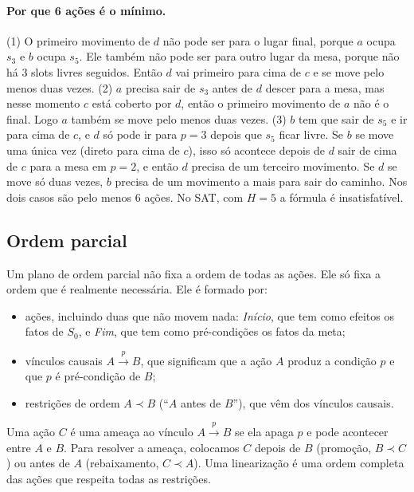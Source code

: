 \documentclass[11pt,a4paper]{article}
\begin{document}
\paragraph{Por que 6 ações é o mínimo.} (1) O primeiro movimento de $d$ não pode
ser para o lugar final, porque $a$ ocupa $s_3$ e $b$ ocupa $s_5$. Ele também não pode
ser para outro lugar da mesa, porque não há 3 slots livres seguidos. Então $d$ vai
primeiro para cima de $c$ e se move pelo menos duas vezes. (2) $a$ precisa sair de
$s_3$ antes de $d$ descer para a mesa, mas nesse momento $c$ está coberto por $d$,
então o primeiro movimento de $a$ não é o final. Logo $a$ também se move pelo menos
duas vezes. (3) $b$ tem que sair de $s_5$ e ir para cima de $c$, e $d$ só pode ir
para $p=3$ depois que $s_5$ ficar livre. Se $b$ se move uma única vez (direto para
cima de $c$), isso só acontece depois de $d$ sair de cima de $c$ para a mesa em
$p=2$, e então $d$ precisa de um terceiro movimento. Se $d$ se move só duas vezes,
$b$ precisa de um movimento a mais para sair do caminho. Nos dois casos são pelo
menos 6 ações. No SAT, com $H=5$ a fórmula é insatisfatível.

\subsection{Ordem parcial}
\label{sec:pop}
Um plano de ordem parcial não fixa a ordem de todas as ações. Ele só fixa a ordem
que é realmente necessária. Ele é formado por:
\begin{itemize}
  \item ações, incluindo duas que não movem nada: \textit{Início}, que tem como
        efeitos os fatos de $S_0$, e \textit{Fim}, que tem como pré-condições os
        fatos da meta;
  \item vínculos causais $A\xrightarrow{\;p\;}B$, que significam que a ação $A$
        produz a condição $p$ e que $p$ é pré-condição de $B$;
  \item restrições de ordem $A\prec B$ (``$A$ antes de $B$''), que vêm dos vínculos
        causais.
\end{itemize}
Uma ação $C$ é uma ameaça ao vínculo $A\xrightarrow{p}B$ se ela apaga $p$ e pode
acontecer entre $A$ e $B$. Para resolver a ameaça, colocamos $C$ depois de $B$
(promoção, $B\prec C$) ou antes de $A$ (rebaixamento, $C\prec A$). Uma
linearização é uma ordem completa das ações que respeita todas as restrições.
\end{document}
